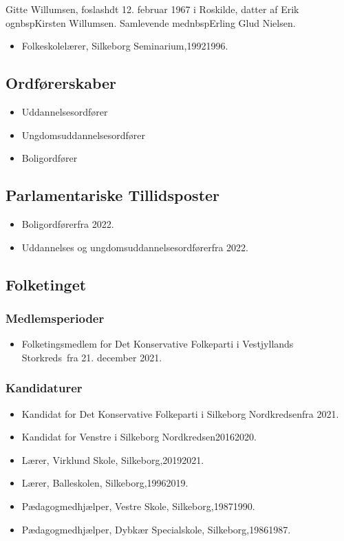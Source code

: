 \documentclass[11pt, a4paper]{awesome-cv}
\begin{document}
\makecvheader[R]
\makelettertitle
\begin{cvletter}
Gitte Willumsen, foslashdt 12. februar 1967 i Roskilde, datter af Erik ognbspKirsten Willumsen. Samlevende mednbspErling Glud Nielsen.

\begin{itemize}
\item Folkeskolelærer, Silkeborg Seminarium,19921996.
\end{itemize}
\subsection*{Ordførerskaber}
\begin{itemize}
\item Uddannelsesordfører
\item Ungdomsuddannelsesordfører
\item Boligordfører
\end{itemize}
\subsection*{Parlamentariske Tillidsposter}
\begin{itemize}
\item Boligordførerfra 2022.
\item Uddannelses og ungdomsuddannelsesordførerfra 2022.
\end{itemize}
\subsection*{Folketinget}
\subsubsection*{Medlemsperioder}
\begin{itemize}
\item Folketingsmedlem for Det Konservative Folkeparti i Vestjyllands Storkreds fra 21. december 2021.
\end{itemize}
\subsubsection*{Kandidaturer}
\begin{itemize}
\item Kandidat for Det Konservative Folkeparti i Silkeborg Nordkredsenfra 2021.
\item Kandidat for Venstre i Silkeborg Nordkredsen20162020.
\end{itemize}
\begin{itemize}
\item Lærer, Virklund Skole, Silkeborg,20192021.
\item Lærer, Balleskolen, Silkeborg,19962019.
\item Pædagogmedhjælper, Vestre Skole, Silkeborg,19871990.
\item Pædagogmedhjælper, Dybkær Specialskole, Silkeborg,19861987.
\end{itemize}
\end{cvletter}
\end{document}
